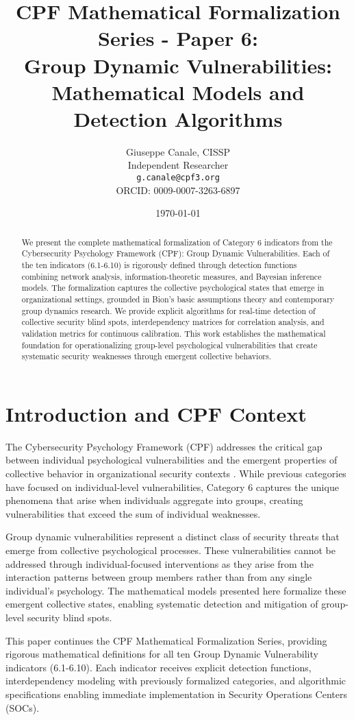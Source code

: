 \documentclass[11pt,a4paper]{article}
\title{CPF Mathematical Formalization Series - Paper 6:\\Group Dynamic Vulnerabilities: Mathematical Models and Detection Algorithms}
\author{
    Giuseppe Canale, CISSP\\
    Independent Researcher\\
    \texttt{g.canale@cpf3.org}\\
    ORCID: 0009-0007-3263-6897
}
\date{\today}
\begin{document}
\maketitle

\begin{abstract}
We present the complete mathematical formalization of Category 6 indicators from the Cybersecurity Psychology Framework (CPF): Group Dynamic Vulnerabilities. Each of the ten indicators (6.1-6.10) is rigorously defined through detection functions combining network analysis, information-theoretic measures, and Bayesian inference models. The formalization captures the collective psychological states that emerge in organizational settings, grounded in Bion's basic assumptions theory and contemporary group dynamics research. We provide explicit algorithms for real-time detection of collective security blind spots, interdependency matrices for correlation analysis, and validation metrics for continuous calibration. This work establishes the mathematical foundation for operationalizing group-level psychological vulnerabilities that create systematic security weaknesses through emergent collective behaviors.
\end{abstract}

\section{Introduction and CPF Context}

The Cybersecurity Psychology Framework (CPF) addresses the critical gap between individual psychological vulnerabilities and the emergent properties of collective behavior in organizational security contexts \cite{canale2024cpf}. While previous categories have focused on individual-level vulnerabilities, Category 6 captures the unique phenomena that arise when individuals aggregate into groups, creating vulnerabilities that exceed the sum of individual weaknesses.

Group dynamic vulnerabilities represent a distinct class of security threats that emerge from collective psychological processes. These vulnerabilities cannot be addressed through individual-focused interventions as they arise from the interaction patterns between group members rather than from any single individual's psychology. The mathematical models presented here formalize these emergent collective states, enabling systematic detection and mitigation of group-level security blind spots.

This paper continues the CPF Mathematical Formalization Series, providing rigorous mathematical definitions for all ten Group Dynamic Vulnerability indicators (6.1-6.10). Each indicator receives explicit detection functions, interdependency modeling with previously formalized categories, and algorithmic specifications enabling immediate implementation in Security Operations Centers (SOCs).
\end{document}
